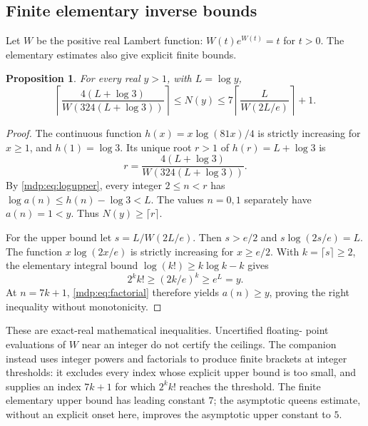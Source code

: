 \documentclass[11pt,letterpaper]{article}
\numberwithin{equation}{section}
\newtheorem{proposition}[theorem]{Proposition}
\theoremstyle{remark}\newtheorem{remark}[theorem]{Remark}
\newcommand{\ceil}[1]{\left\lceil#1\right\rceil}
\begin{document}
\subsection{Finite elementary inverse bounds}
Let $W$ be the positive real Lambert function: $W(t)e^{W(t)}=t$ for
$t>0$. The elementary estimates also give explicit finite bounds.
\begin{proposition}\label{mdp:prop:finiteinverse}
For every real $y>1$, with $L=\log y$,
\begin{equation}\label{mdp:eq:finiteinverse}
 \ceil{\frac{4(L+\log3)}{W(324(L+\log3))}}
 \le N(y)\le
 7\ceil{\frac{L}{W(2L/e)}}+1.
\end{equation}
\end{proposition}
\begin{proof}
The continuous function $h(x)=x\log(81x)/4$ is strictly increasing
for $x\ge1$, and $h(1)=\log3$. Its unique root $r>1$ of
$h(r)=L+\log3$ is
\[
 r=\frac{4(L+\log3)}{W(324(L+\log3))}.
\]
By \eqref{mdp:eq:logupper}, every integer $2\le n<r$ has
$\log a(n)\le h(n)-\log3<L$. The values $n=0,1$ separately have
$a(n)=1<y$. Thus $N(y)\ge\lceil r\rceil$.

For the upper bound let $s=L/W(2L/e)$. Then $s>e/2$ and
$s\log(2s/e)=L$. The function $x\log(2x/e)$ is strictly increasing
for $x\ge e/2$. With $k=\lceil s\rceil\ge2$, the elementary integral
bound $\log(k!)\ge k\log k-k$ gives
\[
 2^k k!\ge(2k/e)^k\ge e^L=y.
\]
At $n=7k+1$, \eqref{mdp:eq:factorial} therefore yields
$a(n)\ge y$, proving the right inequality without monotonicity.
\end{proof}
These are exact-real mathematical inequalities. Uncertified floating-
point evaluations of $W$ near an integer do not certify the ceilings.
The companion instead uses integer powers and factorials to produce
finite brackets at integer thresholds: it excludes every index whose
explicit upper bound is too small, and supplies an index $7k+1$ for
which $2^k k!$ reaches the threshold. The finite elementary upper
bound has leading constant $7$; the asymptotic queens estimate, without an explicit
onset here, improves the asymptotic upper constant to $5$.
\end{document}
